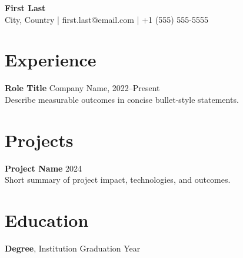 \documentclass[10pt]{article}
\begin{document}
\begin{center}
  {\Large \textbf{First Last}} \\
  \vspace{0.25em}
  City, Country \quad | \quad first.last@email.com \quad | \quad +1 (555) 555-5555
\end{center}

\section*{Experience}
\textbf{Role Title} \hfill Company Name, 2022--Present \\
Describe measurable outcomes in concise bullet-style statements.

\section*{Projects}
\textbf{Project Name} \hfill 2024 \\
Short summary of project impact, technologies, and outcomes.

\section*{Education}
\textbf{Degree}, Institution \hfill Graduation Year
\end{document}
